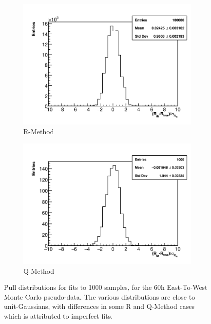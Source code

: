 \begin{figure}[]
    \begin{subfigure}[t]{0.45\textwidth}
        \centering
        \includegraphics[width=\textwidth]{Rpull_RMethod}
        \caption{R-Method}
    \end{subfigure}
    \hspace{1mm}
    \begin{subfigure}[t]{0.45\textwidth}
        \centering
        \includegraphics[width=\textwidth]{Rpull_QMethod}
        \caption{Q-Method}
    \end{subfigure}
\caption[]{Pull distributions for fits to 1000 samples, for the 60h East-To-West Monte Carlo pseudo-data. The various distributions are close to unit-Gaussians, with differences in some R and Q-Method cases which is attributed to imperfect fits.}
\label{fig:pulls}
\end{figure}


